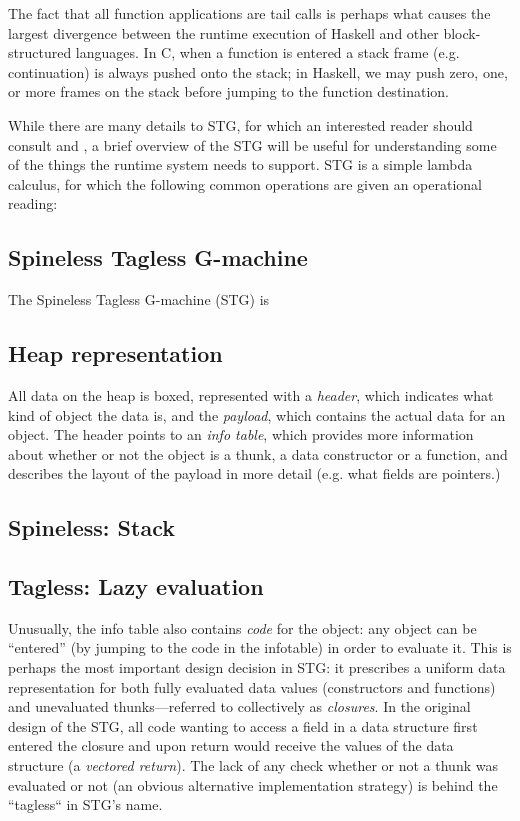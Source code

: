 The fact that all function applications are tail calls is perhaps what
causes the largest divergence between the runtime execution of Haskell
and other block-structured languages.  In C, when a function is entered
a stack frame (e.g. continuation) is always pushed onto the stack; in
Haskell, we may push zero, one, or more frames on the stack before
jumping to the function destination.

While there are many details to STG, for which an interested reader
should consult \cite{PeytonJones1992} and \cite{Marlow2006}, a brief
overview of the STG will be useful for understanding some of the things
the runtime system needs to support.  STG is a simple lambda calculus,
for which the following common operations are given an operational
reading:

\subsection{Spineless Tagless G-machine}

The Spineless Tagless G-machine (STG) is 

\subsection{Heap representation}

All data on the heap is boxed, represented with a \emph{header}, which
indicates what kind of object the data is, and the \emph{payload}, which
contains the actual data for an object.  The header points to an
\emph{info table}, which provides more information about whether or not
the object is a thunk, a data constructor or a function, and describes
the layout of the payload in more detail (e.g. what fields are
pointers.) 

\subsection{Spineless: Stack}





\subsection{Tagless: Lazy evaluation}

Unusually, the info table also contains \emph{code} for the object: any
object can be ``entered'' (by jumping to the code in the infotable) in
order to evaluate it.  This is perhaps the most important design
decision in STG: it prescribes a uniform data representation for both
fully evaluated data values (constructors and functions) and unevaluated
thunks---referred to collectively as \emph{closures}.  In the original
design of the STG, all code wanting to access a field in a data
structure first entered the closure and upon return would receive the
values of the data structure (a \emph{vectored return}).  The lack of
any check whether or not a thunk was evaluated or not (an obvious
alternative implementation strategy) is behind the ``tagless`` in STG's
name.

